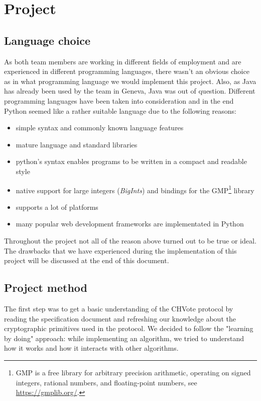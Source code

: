 \chapter{Project}
\section{Language choice}
As both team members are working in different fields of employment and are experienced in different programming languages, there wasn't an obvious choice as in what programming language we would implement this project. Also, as Java has already been used by the team in Geneva, Java was out of question. Different programming languages have been taken into consideration and in the end Python seemed like a rather suitable language due to the following reasons:

\begin{itemize}
	\item simple syntax and commonly known language features
	\item mature language and standard libraries
	\item python's syntax enables programs to be written in a compact and readable style
	\item native support for large integers (\textit{BigInts}) and bindings for the GMP\footnote{GMP is a free library for arbitrary precision arithmetic, operating on signed integers, rational numbers, and floating-point numbers, see \url{https://gmplib.org/}.} library
	\item supports a lot of platforms
	\item many popular web development frameworks are implementated in Python
\end{itemize}

Throughout the project not all of the reason above turned out to be true or ideal. The drawbacks that we have experienced during the implementation of this project will be discussed at the end of this document.

\section{Project method}
The first step was to get a basic understanding of the CHVote protocol by reading the specification document and refreshing our knowledge about the cryptographic primitives used in the protocol. We decided to follow the "learning by doing" approach: while implementing an algorithm, we tried to understand how it works and how it interacts with other algorithms.

